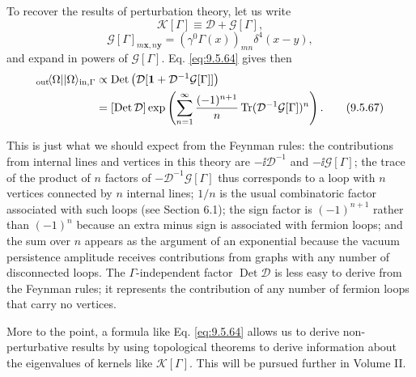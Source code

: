 To recover the results of perturbation theory, let us write
\begin{equation}
\mathcal{K}[\Gamma]\equiv\mathcal{D}+\mathcal{G}[\Gamma],
\tag{9.5.65}\label{eq:9.5.65}
\end{equation}
\begin{equation}
\mathcal{G}[\Gamma]_{m\mathbf{x},n\mathbf{y}}
=(\gamma^0\Gamma(x))_{mn}\delta^4(x-y),
\tag{9.5.66}\label{eq:9.5.66}
\end{equation}
and expand in powers of $\mathcal{G}[\Gamma]$. Eq. \eqref{eq:9.5.64} gives then
\begin{align}
{}_{\mathrm{out}}\!\langle \Omega\rvert\lvert \Omega\rangle_{\mathrm{in},\Gamma}
&\propto\operatorname{Det}
 \left(\mathcal{D}[\mathbf{1}+\mathcal{D}^{-1}\mathcal{G}[\Gamma]]\right)
\notag\\
&=[\operatorname{Det}\mathcal{D}]
 \exp\left(\sum_{n=1}^{\infty}\frac{(-1)^{n+1}}{n}
 \operatorname{Tr}(\mathcal{D}^{-1}\mathcal{G}[\Gamma])^n\right).
\tag{9.5.67}\label{eq:9.5.67}
\end{align}

This is just what we should expect from the Feynman rules: the contributions
from internal lines and vertices in this theory are $-\ii\mathcal{D}^{-1}$ and
$-\ii\mathcal{G}[\Gamma]$; the trace of the product of $n$ factors of
$-\mathcal{D}^{-1}\mathcal{G}[\Gamma]$ thus corresponds to a loop with $n$
vertices connected by $n$ internal lines; $1/n$ is the usual combinatoric
factor associated with such loops (see Section 6.1); the sign factor is
$(-1)^{n+1}$ rather than $(-1)^n$ because an extra minus sign is associated
with fermion loops; and the sum over $n$ appears as the argument of an
exponential because the vacuum persistence amplitude receives contributions
from graphs with any number of disconnected loops. The $\Gamma$-independent
factor $\operatorname{Det}\mathcal{D}$ is less easy to derive from the Feynman
rules; it represents the contribution of any number of fermion loops that
carry no vertices.

More to the point, a formula like Eq. \eqref{eq:9.5.64} allows us to derive
non-perturbative results by using topological theorems to derive information
about the eigenvalues of kernels like $\mathcal{K}[\Gamma]$. This will be
pursued further in Volume II.
